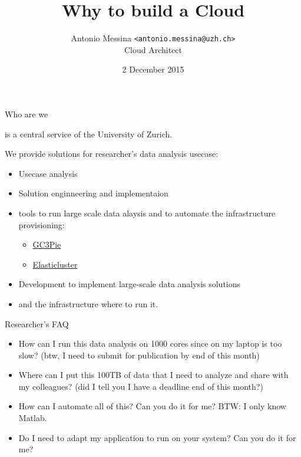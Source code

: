 \documentclass[english,serif,mathserif,usenames,dvipsnames]{beamer}
\begin{document}
\title[Why a Cloud]{Why to build a Cloud}
\subtitle{}
\author{Antonio Messina \texttt{<antonio.messina@uzh.ch>}\\Cloud
  Architect}
\date{2 December 2015}

  \maketitle

\begin{frame}
  {Who are we}

  \sssit is a central service of the University of Zurich.

\+
  We provide solutions for researcher's data analysis usecase:
  \begin{itemize}
  \item Usecase analysis
  \item Solution enginneering and implementaion
  \item tools to run large scale data alaysis and to automate the infrastructure provisioning:
    \begin{itemize}
    \item \href{http://gc3pie.readthedocs.org/en/latest/}{GC3Pie}
    \item \href{http://gc3-uzh-ch.github.io/elasticluster/}{Elasticluster}
    \end{itemize}
  \item Development to implement large-scale data analysis solutions
  \item and the infrastructure where to run it.
  \end{itemize}

\end{frame}

\begin{frame}
  {Researcher's FAQ}

  \begin{itemize}
  \item How can I run this data analysis on 1000 cores since on my
    laptop is too slow? {\scriptsize(btw, I need to submit for
      publication by end of this month)} \+

  \item Where can I put this 100TB of data that I need to analyze and
    share with my colleagues?
    {\scriptsize(did I tell you I have a deadline end of this month?)}
    \+

  \item How can I automate all of this? Can you do it for me? BTW: I
    only know Matlab.
    \+

  \item Do I need to adapt my application to run on your system? Can
    you do it for me?
  \end{itemize}
\end{frame}
\end{document}
